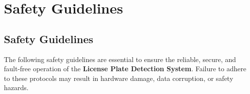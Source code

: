 %
%

\chapter{Safety Guidelines}

\section{Safety Guidelines}

The following safety guidelines are essential to ensure the reliable, secure, and fault-free operation of the \textbf{License Plate Detection System}. Failure to adhere to these protocols may result in hardware damage, data corruption, or safety hazards.

\vspace{0.5cm}

